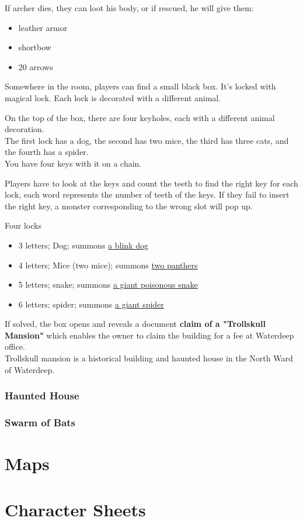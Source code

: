 \documentclass[10pt,onecolumn,twoside,openany,bg=full,layout=true]{dndbook}
\begin{document}
If archer dies, they can loot his body, or if rescued, he will give them:
\begin{itemize}
  \item leather armor
  \item shortbow
  \item 20 arrows
\end{itemize}
Somewhere in the room, players can find a small black box.
It's locked with magical lock.
Each lock is decorated with a different animal.
\begin{DndReadAloud}
On the top of the box, there are four keyholes, each with a different animal decoration.\\
The first lock has a dog, the second has two mice, the third has three cats, and the fourth has a spider.\\
You have four keys with it on a chain.
\end{DndReadAloud}
Players have to look at the keys and count the teeth to find the right key for each lock, each word represents the
number of teeth of the keys.
If they fail to insert the right key, a monster corresponding to the wrong slot will pop up.

Four locks
\begin{itemize}
\item 3 letters; Dog; summons \href{https://www.dndbeyond.com/monsters/16809-blink-dog}{a blink dog}
\item 4 letters; Mice (two mice); summons \href{https://www.dndbeyond.com/monsters/16976-panther}{two panthers}
\item 5 letters; snake; summons \href{https://www.dndbeyond.com/monsters/16890-giant-poisonous-snake}{a giant poisonous snake}
\item 6 letters; spider; summons \href{https://www.dndbeyond.com/monsters/16895-giant-spider}{a giant spider}
\end{itemize}

If solved, the box opens and reveals a document \textbf{claim of a "Trollskull Mansion"} which enables the owner to
claim the building for a fee at Waterdeep office.\\
Trollskull mansion is a historical building and haunted house in the North Ward of Waterdeep.








\subsection{Haunted House}\label{subsec:haunted-house}
\lipsum[1]

\subsection{Swarm of Bats}\label{subsec:swarm-of-bats}
\lipsum[1]

\vfill
\newpage

\chapter{Maps}\label{ch:maps}

\chapter{Character Sheets}\label{ch:charactersheets}
\end{document}
